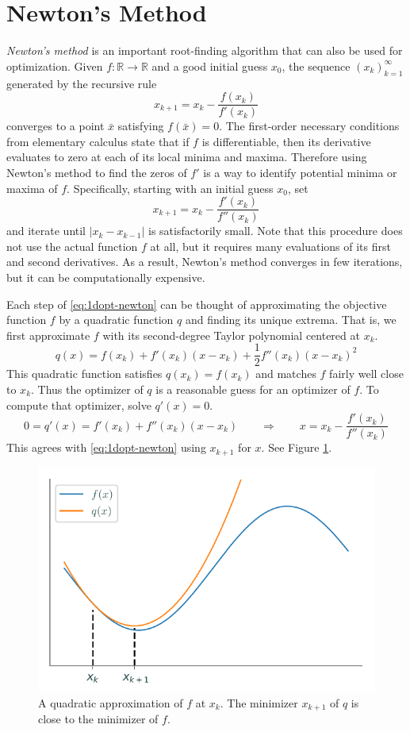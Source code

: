 \section*{Newton's Method} %

\emph{Newton's method} is an important root-finding algorithm that can also be used for optimization.
Given $f:\mathbb{R}\rightarrow\mathbb{R}$ and a good initial guess $x_0$, the sequence $(x_k)_{k=1}^\infty$ generated by the recursive rule
\[
x_{k+1} = x_k - \frac{f(x_k)}{f'(x_k)}
\]
converges to a point $\bar{x}$ satisfying $f(\bar{x}) = 0$.
The first-order necessary conditions from elementary calculus state that if $f$ is differentiable, then its derivative evaluates to zero at each of its local minima and maxima.
Therefore using Newton's method to find the zeros of $f'$ is a way to identify potential minima or maxima of $f$.
Specifically, starting with an initial guess $x_0$, set
\begin{equation}
x_{k+1} = x_k - \frac{f'(x_k)}{f''(x_k)}
\label{eq:1dopt-newton}
\end{equation}
and iterate until $|x_k - x_{k-1}|$ is satisfactorily small.
Note that this procedure does not use the actual function $f$ at all, but it requires many evaluations of its first and second derivatives.
As a result, Newton's method converges in few iterations, but it can be computationally expensive.

Each step of \eqref{eq:1dopt-newton} can be thought of approximating the objective function $f$ by a quadratic function $q$ and finding its unique extrema.
That is, we first approximate $f$ with its second-degree Taylor polynomial centered at $x_k$.
\[
q(x) = f(x_k) + f'(x_k) (x - x_k) + \frac{1}{2} f''(x_k) (x - x_k)^2
\]
This quadratic function satisfies $q(x_k) = f(x_k)$ and matches $f$ fairly well close to $x_k$.
Thus the optimizer of $q$ is a reasonable guess for an optimizer of $f$.
To compute that optimizer, solve $q'(x) = 0$.
\[
0 = q'(x) = f'(x_k) + f''(x_k)(x - x_k)
\qquad\Longrightarrow\qquad
x = x_k - \frac{f'(x_k)}{f''(x_k)}
\]
This agrees with \eqref{eq:1dopt-newton} using $x_{k+1}$ for $x$.
See Figure \ref{fig:1dopt-quadratic-newton}.

\begin{figure}[H]
\centering
\includegraphics[width = .7 \textwidth]{figures/quad_approx.pdf}
\caption{A quadratic approximation of $f$ at $x_k$.
The minimizer $x_{k+1}$ of $q$ is close to the minimizer of $f$.
}
\label{fig:1dopt-quadratic-newton}
\end{figure}

